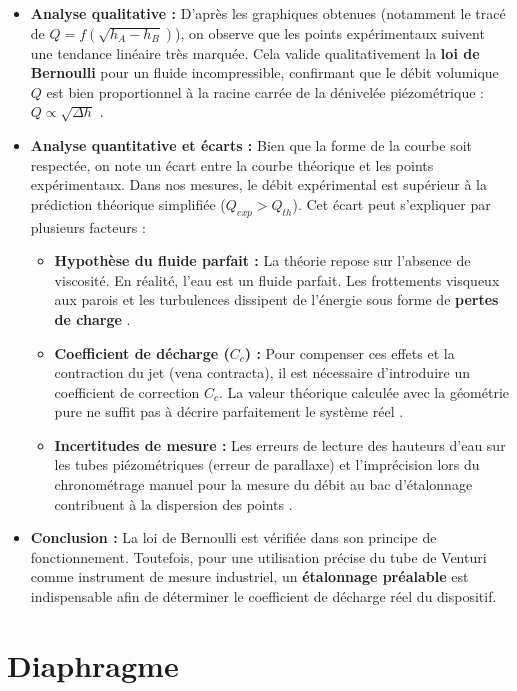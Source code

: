 		\begin{itemize}
			\item \textbf{Analyse qualitative :} 
			D'après les graphiques obtenues (notamment le tracé de $Q = f(\sqrt{h_A - h_B})$), on observe que les points expérimentaux suivent une tendance linéaire très marquée. Cela valide qualitativement la \textbf{loi de Bernoulli} pour un fluide incompressible, confirmant que le débit volumique $Q$ est bien proportionnel à la racine carrée de la dénivelée piézométrique : $Q \propto \sqrt{\Delta h}$ .
			
			\item \textbf{Analyse quantitative et écarts :} 
			Bien que la forme de la courbe soit respectée, on note un écart entre la courbe théorique et les points expérimentaux. Dans nos mesures, le débit expérimental est supérieur à la prédiction théorique simplifiée ($Q_{exp} > Q_{th}$). Cet écart peut s'expliquer par plusieurs facteurs :
			\begin{itemize}
				\item \textbf{Hypothèse du fluide parfait :} La théorie repose sur l'absence de viscosité. En réalité, l'eau est un fluide parfait. Les frottements visqueux aux parois et les turbulences dissipent de l'énergie sous forme de \textbf{pertes de charge} .
				\item \textbf{Coefficient de décharge ($C_c$) :} Pour compenser ces effets et la contraction du jet (vena contracta), il est nécessaire d'introduire un coefficient de correction $C_c$. La valeur théorique calculée avec la géométrie pure ne suffit pas à décrire parfaitement le système réel .
				\item \textbf{Incertitudes de mesure :} Les erreurs de lecture des hauteurs d'eau sur les tubes piézométriques (erreur de parallaxe) et l'imprécision lors du chronométrage manuel pour la mesure du débit au bac d'étalonnage contribuent à la dispersion des points .
			\end{itemize}
			
			\item \textbf{Conclusion :} 
			La loi de Bernoulli est vérifiée dans son principe de fonctionnement. Toutefois, pour une utilisation précise du tube de Venturi comme instrument de mesure industriel, un \textbf{étalonnage préalable} est indispensable afin de déterminer le coefficient de décharge réel du dispositif.
		\end{itemize}
\section{Diaphragme}

